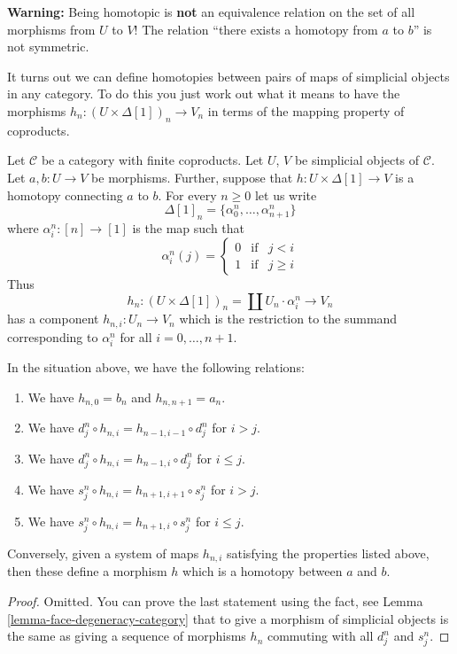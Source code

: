 \noindent
{\bf Warning:} Being homotopic is {\bf not} an equivalence relation on
the set of all morphisms from $U$ to $V$! The relation
``there exists a homotopy from $a$ to $b$'' is not symmetric.

\medskip\noindent
It turns out we can define homotopies between pairs of maps of simplicial
objects in any category. To do this you just work out what it means to have
the morphisms $h_n : (U \times \Delta[1])_n \to V_n$ in terms of the mapping
property of coproducts.

\medskip\noindent
Let $\mathcal{C}$ be a category with finite coproducts.
Let $U$, $V$ be simplicial objects of $\mathcal{C}$.
Let $a, b : U \to V$ be morphisms. Further, suppose
that $h : U \times \Delta[1] \to V$ is a homotopy
connecting $a$ to $b$. For every $n \geq 0$
let us write
$$
\Delta[1]_n = \{\alpha^n_0, \ldots, \alpha^n_{n + 1}\}
$$
where $\alpha^n_i : [n] \to [1]$ is the map
such that
$$
\alpha^n_i(j)
=
\left\{
\begin{matrix}
0 & \text{if} & j < i\\
1 & \text{if} & j \geq i
\end{matrix}
\right.
$$
Thus
$$
h_n : (U \times \Delta[1])_n = \coprod U_n \cdot \alpha^n_i
\longrightarrow
V_n
$$
has a component $h_{n, i} : U_n \to V_n$ which is the restriction
to the summand corresponding to $\alpha^n_i$ for all $i = 0, \ldots, n + 1$.

\begin{lemma}
\label{lemma-relations-homotopy}
In the situation above, we have the following relations:
\begin{enumerate}
\item We have $h_{n, 0} = b_n$ and $h_{n, n + 1} = a_n$.
\item We have $d^n_j \circ h_{n, i} = h_{n - 1, i - 1} \circ d^n_j$
for $i > j$.
\item We have $d^n_j \circ h_{n, i} = h_{n - 1, i} \circ d^n_j$
for $i \leq j$.
\item We have $s^n_j \circ h_{n, i} = h_{n + 1, i + 1} \circ s^n_j$
for $i > j$.
\item We have $s^n_j \circ h_{n, i} = h_{n + 1, i} \circ s^n_j$
for $i \leq j$.
\end{enumerate}
Conversely, given a system of maps $h_{n, i}$ satisfying the
properties listed above, then these define a morphism
$h$ which is a homotopy between $a$ and $b$.
\end{lemma}

\begin{proof}
Omitted. You can prove the last statement using the fact,
see Lemma \ref{lemma-face-degeneracy-category} that
to give a morphism of simplicial objects is the
same as giving a sequence of morphisms $h_n$ commuting
with all $d^n_j$ and $s^n_j$.
\end{proof}


